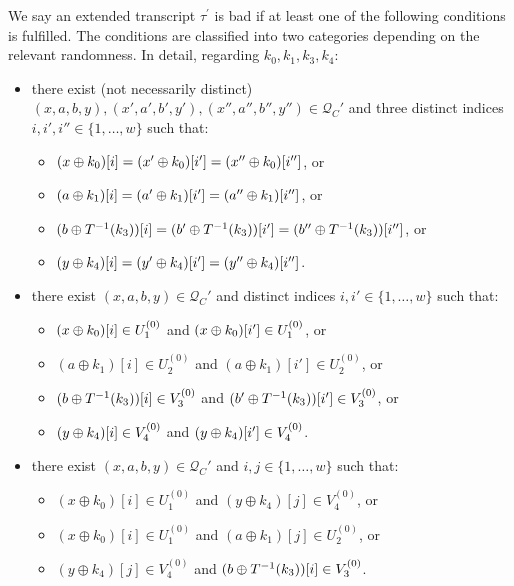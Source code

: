 \begin{definition}
\label{defn:bad-tau-4-rounds}

We say an extended transcript $\tau^{\prime}$ is bad if at least one of the following conditions is fulfilled. The conditions are classified into two categories depending on the relevant randomness. In detail, regarding $k_0,k_1,k_3,k_4$:
\begin{itemize}[leftmargin=10mm]
	\item[\bone] there exist (not necessarily distinct) $(x,a,b,y),(x',a',b',y'),(x'',a'',b'',y'')\in \mathcal{Q}_{C}'$ and three distinct indices $i, i', i'' \in \{1, \ldots, w\}$ such that:
	\begin{itemize}
		\item $(x\oplus k_0)[i]=(x'\oplus k_0)[i']=(x''\oplus k_0)[i'']$, or
		\item $(a\oplus k_1)[i]=(a'\oplus k_1)[i']=(a''\oplus k_1)[i'']$, or
		\item $(b\oplus T^{-1}(k_3))[i]=(b'\oplus T^{-1}(k_3))[i']=(b''\oplus T^{-1}(k_3))[i'']$, or
		\item $(y\oplus k_4)[i]=(y'\oplus k_4)[i']=(y''\oplus k_4)[i'']$.
	\end{itemize}
	\item[\btwo] there exist $(x,a,b,y) \in \mathcal{Q}_{C}'$ and distinct indices $i, i' \in \{1, \ldots, w\}$ such that:
	\begin{itemize}
		\item $(x\oplus k_0)[i]\in U_1^{(0)}$ and $(x\oplus k_0)[i']\in U_1^{(0)}$, or
		\item $(a \oplus k_1)[i]\in U_{2}^{(0)}$ and $(a \oplus k_1)[i']\in U_{2}^{(0)}$, or
		\item $(b\oplus T^{-1}(k_3))[i]\in V_3^{(0)}$ and
		$(b'\oplus T^{-1}(k_3))[i']\in V_3^{(0)}$, or
		\item $(y\oplus k_4)[i]\in V_4^{(0)}$ and $(y\oplus k_4)[i']\in V_4^{(0)}$.
	\end{itemize}
	\item[\bthree] there exist $(x,a,b,y) \in \mathcal{Q}_{C}'$ and $i, j \in \{1, \ldots, w\}$ such that:
	\begin{itemize}
		\item $\left(x \oplus k_{0}\right)[i]\in U_1^{(0)}$ and $\left(y \oplus k_{4}\right)[j]\in V_4^{(0)}$, or
		\item $\left(x \oplus k_{0}\right)[i]\in U_1^{(0)}$ and $\left(a\oplus k_{1}\right)[j]\in U_2^{(0)}$, or
		\item $\left(y \oplus k_{4}\right)[j]\in V_4^{(0)}$ and $(b\oplus T^{-1}(k_3)) [i]\in V_3^{(0)}$.

\end{itemize}
\end{itemize}
\end{definition}
